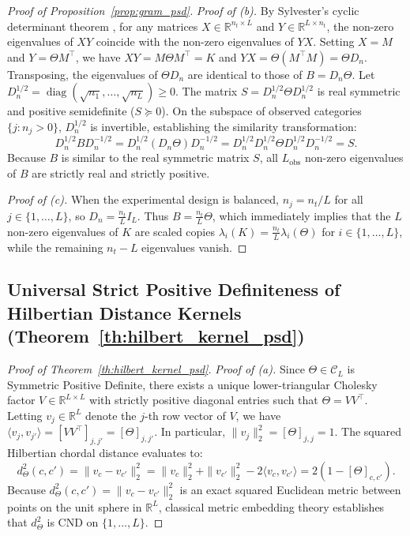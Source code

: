 \documentclass[default,sn-mathphys,Numbered]{sn-jnl}
\theoremstyle{thmstyleone}
\theoremstyle{thmstylethree}
\theoremstyle{thmstyletwo}
\newcommand{\diag}{\operatorname{diag}}
\begin{document}
\begin{appendices}
\begin{proof}[Proof of Proposition~\ref{prop:gram_psd}]
\textit{Proof of (b).} By Sylvester's cyclic determinant theorem \citep{sylvester1851,horn2012matrix}, for any matrices $X \in \mathbb{R}^{n_t \times L}$ and $Y \in \mathbb{R}^{L \times n_t}$, the non-zero eigenvalues of $X Y$ coincide with the non-zero eigenvalues of $Y X$. Setting $X = M$ and $Y = \Theta M^\top$, we have $X Y = M \Theta M^\top = K$ and $Y X = \Theta (M^\top M) = \Theta D_n$. Transposing, the eigenvalues of $\Theta D_n$ are identical to those of $B = D_n \Theta$.
Let $D_n^{1/2} = \diag(\sqrt{n_1}, \ldots, \sqrt{n_L}) \ge 0$. The matrix $S = D_n^{1/2} \Theta D_n^{1/2}$ is real symmetric and positive semidefinite ($S \succeq 0$). On the subspace of observed categories $\{j : n_j > 0\}$, $D_n^{1/2}$ is invertible, establishing the similarity transformation:
\begin{equation}
D_n^{1/2} B D_n^{-1/2} = D_n^{1/2} (D_n \Theta) D_n^{-1/2} = D_n^{1/2} D_n^{1/2} \Theta D_n^{1/2} D_n^{-1/2} = S.
\end{equation}
Because $B$ is similar to the real symmetric matrix $S$, all $L_{\mathrm{obs}}$ non-zero eigenvalues of $B$ are strictly real and strictly positive.

\textit{Proof of (c).} When the experimental design is balanced, $n_j = n_t / L$ for all $j \in \{1, \ldots, L\}$, so $D_n = \frac{n_t}{L} I_L$. Thus $B = \frac{n_t}{L} \Theta$, which immediately implies that the $L$ non-zero eigenvalues of $K$ are scaled copies $\lambda_i(K) = \frac{n_t}{L} \lambda_i(\Theta)$ for $i \in \{1, \ldots, L\}$, while the remaining $n_t - L$ eigenvalues vanish.
\end{proof}

\subsection{Universal Strict Positive Definiteness of Hilbertian Distance Kernels (Theorem~\ref{th:hilbert_kernel_psd})}
\label{subsec:proof_hilbert}

\begin{proof}[Proof of Theorem~\ref{th:hilbert_kernel_psd}]
\textit{Proof of (a).} Since $\Theta \in \mathcal{C}_L$ is Symmetric Positive Definite, there exists a unique lower-triangular Cholesky factor $V \in \mathbb{R}^{L \times L}$ with strictly positive diagonal entries such that $\Theta = V V^\top$. Letting $v_j \in \mathbb{R}^L$ denote the $j$-th row vector of $V$, we have $\langle v_j, v_{j'} \rangle = [V V^\top]_{j, j'} = [\Theta]_{j, j'}$. In particular, $\|v_j\|_2^2 = [\Theta]_{j, j} = 1$. The squared Hilbertian chordal distance evaluates to:
\begin{equation}
d_\Theta^2(c, c') = \|v_c - v_{c'}\|_2^2 = \|v_c\|_2^2 + \|v_{c'}\|_2^2 - 2 \langle v_c, v_{c'} \rangle = 2(1 - [\Theta]_{c, c'}).
\end{equation}
Because $d_\Theta^2(c, c') = \|v_c - v_{c'}\|_2^2$ is an exact squared Euclidean metric between points on the unit sphere in $\mathbb{R}^L$, classical metric embedding theory \citep[Theorem~1]{schoenberg1938metric} establishes that $d_\Theta^2$ is CND on $\{1, \dots, L\}$.


\end{proof}
\end{appendices}
\end{document}
